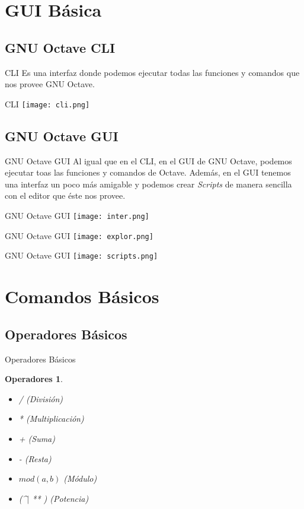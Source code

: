 \documentclass[12pt]{beamer}
\newtheorem{oper}{Operadores}
\begin{document}
\section{GUI Básica}
\subsection{GNU Octave CLI}
\begin{frame}{CLI}
Es una interfaz donde podemos ejecutar todas las funciones y comandos que nos provee GNU Octave.
\end{frame}
\begin{frame}{CLI}
\texttt{[image: cli.png]}
\end{frame}
\subsection{GNU Octave GUI}
\begin{frame}{GNU Octave GUI}
Al igual que en el CLI, en el GUI de GNU Octave, podemos ejecutar toas las funciones y comandos de Octave. Además, en el GUI tenemos una interfaz un poco más amigable y podemos crear \textit{Scripts} de manera sencilla con el editor que éste nos provee.
\end{frame}
\begin{frame}{GNU Octave GUI}
\texttt{[image: inter.png]}
\end{frame}
\begin{frame}{GNU Octave GUI}
\texttt{[image: explor.png]}
\end{frame}
\begin{frame}{GNU Octave GUI}
\texttt{[image: scripts.png]}
\end{frame}
\section{Comandos Básicos}
\subsection{Operadores Básicos}
\begin{frame}{Operadores Básicos}
\begin{oper}
	\begin{itemize}
		\item / (División)
		\item * (Multiplicación)
		\item + (Suma)
		\item - (Resta)
		\item $mod(a, b)$ (Módulo)
		\item (\^\space\space $\mid$ ** ) (Potencia) 
	\end{itemize}
\end{oper}
\end{frame}
\end{document}
